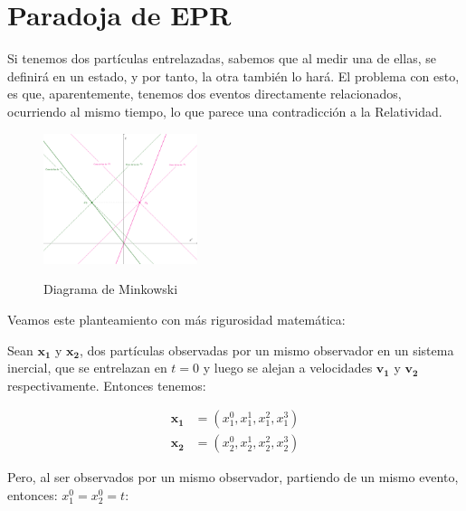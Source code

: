\section{Paradoja de EPR}


Si tenemos dos partículas entrelazadas, sabemos que al medir una de ellas, se definirá en un estado, y por tanto, la otra también lo hará. El problema con esto, es que, aparentemente, tenemos dos eventos directamente relacionados, ocurriendo al mismo tiempo, lo que parece una contradicción a la Relatividad.


% 

\begin{figure}[H]
    \centering
    \includegraphics[width=0.4\textwidth]{Graphics/SpaceLike.pdf}
    \label{fig:SpaceLike}
    \caption{Diagrama de Minkowski}
\end{figure}
\bigskip

Veamos este planteamiento con más rigurosidad matemática:

\medskip

Sean $\mathbf{x_1}$ y $\mathbf{x_2}$, dos partículas observadas por un mismo observador en un sistema inercial, que se entrelazan en $t=0$ y luego se alejan a velocidades $\mathbf{v_1}$ y $\mathbf{v_2}$ respectivamente. Entonces tenemos:

\begin{align*}
    \mathbf{x_1} &= \left(x^0_1,x^1_1,x^2_1,x^3_1\right)\\
    \mathbf{x_2} &= \left(x^0_2,x^1_2,x^2_2,x^3_2\right)
\end{align*}

Pero, al ser observados por un mismo observador, partiendo de un mismo evento, entonces: $x^0_1=x^0_2=t$:

